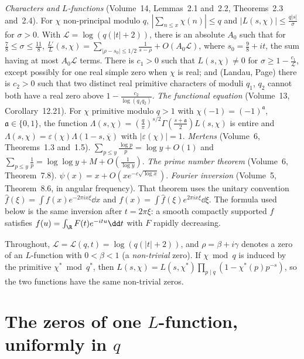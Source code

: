 \begin{reminder}
\emph{Characters and $L$-functions} (Volume~14, Lemmas~2.1 and~2.2, Theorems~2.3 and~2.4). For $\chi$ non-principal modulo $q$, $|\sum_{n\le x}\chi(n)|\le q$ and $|L(s,\chi)|\le\frac{q|s|}\sigma$ for $\sigma>0$. With $\mathcal L=\log(q(|t|+2))$, there is an absolute $A_0$ such that for $\frac78\le\sigma\le\frac{11}8$, $\frac{L'}L(s,\chi)=\sum_{|\rho-s_0|\le1/2}\frac1{s-\rho}+O(A_0\mathcal L)$, where $s_0=\frac98+it$, the sum having at most $A_0\mathcal L$ terms. There is $c_1>0$ such that $L(s,\chi)\ne0$ for $\sigma\ge1-\frac{c_1}{\mathcal L}$, except possibly for one real simple zero when $\chi$ is real; and (Landau, Page) there is $c_2>0$ such that two distinct real primitive characters of moduli $q_1$, $q_2$ cannot both have a real zero above $1-\frac{c_2}{\log(q_1q_2)}$.
\emph{The functional equation} (Volume~13, Corollary~12.21). For $\chi$ primitive modulo $q>1$ with $\chi(-1)=(-1)^{\mathfrak a}$, $\mathfrak a\in\{0,1\}$, the function $\Lambda(s,\chi)=(\frac q\pi)^{s/2}\Gamma(\frac{s+\mathfrak a}2)L(s,\chi)$ is entire and $\Lambda(s,\chi)=\varepsilon(\chi)\Lambda(1-s,\overline\chi)$ with $|\varepsilon(\chi)|=1$.
\emph{Mertens} (Volume~6, Theorems~1.3 and~1.5). $\sum_{p\le y}\frac{\log p}p=\log y+O(1)$ and $\sum_{p\le y}\frac1p=\log\log y+M+O(\frac1{\log y})$.
\emph{The prime number theorem} (Volume~6, Theorem~7.8). $\psi(x)=x+O(xe^{-c\sqrt{\log x}})$.
\emph{Fourier inversion} (Volume~5, Theorem~8.6, in angular frequency). That theorem uses the unitary convention $\hat f(\xi)=\int f(x)e^{-2\pi ix\xi}\dd x$ and $f(x)=\int\hat f(\xi)e^{2\pi ix\xi}\dd\xi$. The formula used below is the same inversion after $t=2\pi\xi$: a smooth compactly supported $f$ satisfies $f(u)=\int_\R F(t)e^{-itu}\dd t$ with $F$ rapidly decreasing.
\end{reminder}

Throughout, $\mathcal L=\mathcal L(q,t)=\log(q(|t|+2))$, and $\rho=\beta+i\gamma$ denotes a zero of an $L$-function with $0<\beta<1$ (a \emph{non-trivial} zero). If $\chi\bmod q$ is induced by the primitive $\chi^*\bmod q^*$, then $L(s,\chi)=L(s,\chi^*)\prod_{p\mid q}(1-\chi^*(p)p^{-s})$, so the two functions have the same non-trivial zeros.

\section{The zeros of one \texorpdfstring{$L$}{L}-function, uniformly in \texorpdfstring{$q$}{q}}

